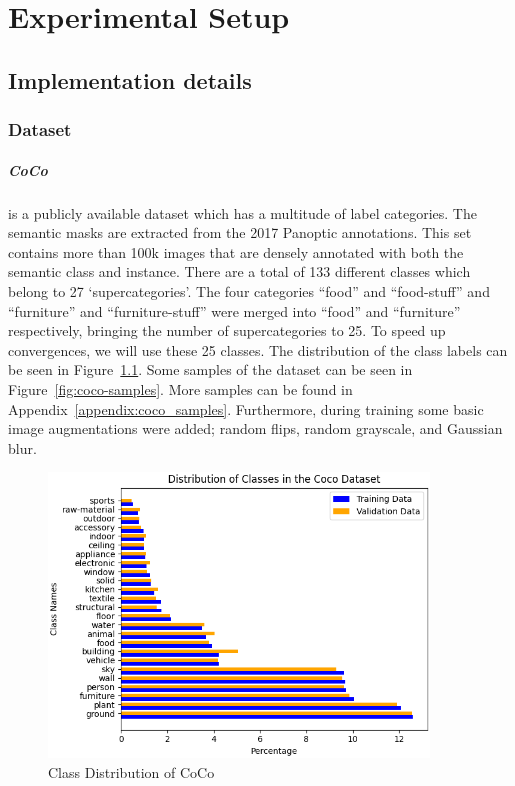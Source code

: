 \chapter{Experimental Setup}\label{chapter:second_real_chapter}

\section{Implementation details}
\subsection{Dataset}
\paragraph{CoCo~\cite{lin2015microsoftcococommonobjects}} is a publicly available dataset which has a multitude of label categories. The semantic masks are extracted from the 2017 Panoptic annotations. This set contains more than 100k images that are densely annotated with both the semantic class and instance. There are a total of 133 different classes which belong to 27 `supercategories'. The four categories ``food'' and ``food-stuff'' and ``furniture'' and ``furniture-stuff'' were merged into ``food'' and ``furniture'' respectively, bringing the number of supercategories to 25. To speed up convergences, we will use these 25 classes. The distribution of the class labels can be seen in Figure~\ref{fig:coco-class-distribution}. Some samples of the dataset can be seen in Figure~\ref{fig:coco-samples}. More samples can be found in Appendix~\ref{appendix:coco_samples}. Furthermore, during training some basic image augmentations were added; random flips, random grayscale, and Gaussian blur.


\begin{figure}[h]
    \centering
    \includegraphics[width=0.9\textwidth]{figures/datasets/coco/class_distribution.png}
    \caption{Class Distribution of CoCo}
    \label{fig:coco-class-distribution}
\end{figure}


